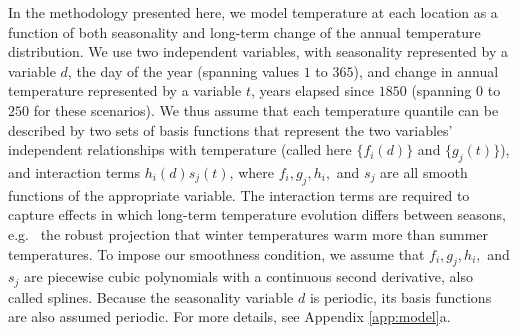 \documentclass{ametsoc}
\begin{document}
In the methodology presented here, we model temperature at each location as a function of both seasonality and long-term change of the annual temperature distribution. %
We use two independent variables, with seasonality represented by a variable $d$, the day of the year (spanning values $1$ to $365$), and change in annual temperature represented by a variable $t$, years elapsed since $1850$ (spanning $0$ to $250$ for these scenarios).
We thus assume that each temperature quantile can be described by two sets of basis functions that represent the two variables' independent relationships with temperature (called here $\{f_i(d)\}$ and $\{g_j(t)\}$), and interaction terms $h_i(d)s_j(t)$, where 
$f_i, g_j, h_i,$ and $s_j$ are all smooth functions of the appropriate variable. %
The interaction terms are required to capture effects in which long-term temperature evolution differs between seasons, e.g.\
the robust projection that winter temperatures warm more than summer temperatures. 
To impose our smoothness condition, we assume that $f_i, g_j, h_i,$ and $s_j$ are piecewise cubic polynomials with a continuous second derivative, also called splines. \citep[For a review of cubic polynomial basis functions, see][Chapter 5.]{ESL}
Because the seasonality variable $d$ is periodic, its basis functions are also assumed periodic. 
For more details, see Appendix \ref{app:model}a.
\end{document}
